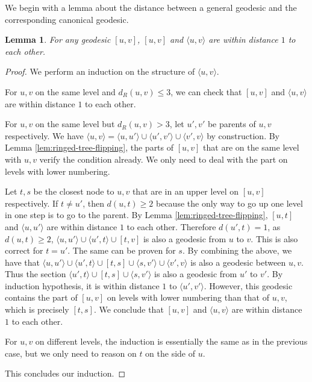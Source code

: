 \documentclass[11pt]{article}
\newtheorem{lem}{Lemma}
\begin{document}
We begin with a lemma about the distance between a general geodesic and the corresponding canonical geodesic.

\begin{lem}\label{lem:rectified-geodesic}
For any geodesic $[u,v]$, $[u,v]$ and $\langle u,v \rangle$ are within distance $1$ to each other.
\end{lem}

\begin{proof}
We perform an induction on the structure of $\langle u,v \rangle$.

For $u,v$ on the same level and $d_R(u,v) \leq 3$, we can check that $[u,v]$ and $\langle u,v \rangle$ are within distance $1$ to each other.

For $u,v$ on the same level but $d_R(u,v) > 3$, let $u', v'$ be parents of $u,v$ respectively. We have $\langle u,v \rangle = 
	\langle u, u'\rangle \cup \langle u', v' \rangle \cup 
	\langle v',v\rangle$ by construction. 
By Lemma \ref{lem:ringed-tree-flipping}, the parts of $[u,v]$ that are
	on the same level with $u,v$ verify the condition already. We only need to deal with the part on levels with lower numbering.

Let $t, s$ be the closest node to $u,v$ that are in an upper level on 
	$[u,v]$ respectively. 
If $t \neq u'$, then $d(u,t) \geq 2$ because the only way to go up one level in one step is to go to the parent. By Lemma \ref{lem:ringed-tree-flipping}, $[u,t]$ and $\langle u,u' \rangle$ are within distance $1$ to each other. Therefore $d(u',t)=1$, as $d(u,t) \geq 2$, 
	$\langle u, u' \rangle \cup \langle u', t \rangle \cup[t,v]$ is also a geodesic from $u$ to $v$. This is also correct for $t=u'$. The same can be proven for $s$. 
By combining the above, we have that $\langle u, u' \rangle \cup 
	\langle u', t \rangle
	\cup [t,s] \cup \langle s, v'\rangle \cup \langle v', v \rangle$ is also a geodesic between $u,v$.
Thus the section $\langle u', t \rangle
	\cup [t,s] \cup \langle s, v'\rangle$ is also a geodesic from $u'$ to $v'$. By induction hypothesis, it is within distance $1$ to $\langle u', v' \rangle$. However, this geodesic contains the part of $[u,v]$ on levels with lower numbering than that of $u,v$, which is precisely $[t,s]$. We conclude that $[u,v]$ and $\langle u,v \rangle$ are within distance $1$ to each other.

For $u,v$ on different levels, the induction is essentially the same as in the previous case, but we only need to reason on $t$ on the side of $u$.

This concludes our induction.
\end{proof}
\end{document}
